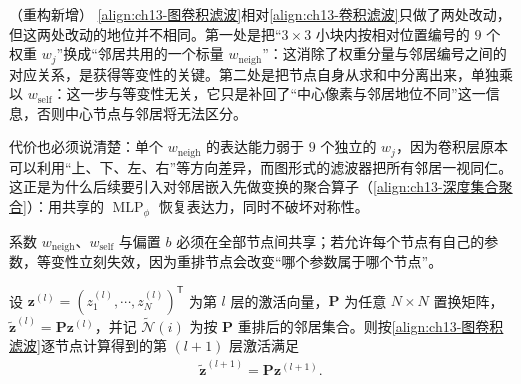 \documentclass[../../main.tex]{subfiles}
\begin{document}
\begin{remark}（重构新增）
\eqref{align:ch13-图卷积滤波}相对\eqref{align:ch13-卷积滤波}只做了两处改动，但这两处改动的地位并不相同。第一处是把“$3\times 3$ 小块内按相对位置编号的 $9$ 个权重 $w_j$”换成“邻居共用的一个标量 $w_{\mathrm{neigh}}$”：这消除了权重分量与邻居编号之间的对应关系，是获得等变性的关键。第二处是把节点自身从求和中分离出来，单独乘以 $w_{\mathrm{self}}$：这一步与等变性无关，它只是补回了“中心像素与邻居地位不同”这一信息，否则中心节点与邻居将无法区分。\par
代价也必须说清楚：单个 $w_{\mathrm{neigh}}$ 的表达能力弱于 $9$ 个独立的 $w_j$，因为卷积层原本可以利用“上、下、左、右”等方向差异，而图形式的滤波器把所有邻居一视同仁。这正是为什么后续要引入对邻居嵌入先做变换的聚合算子（\eqref{align:ch13-深度集合聚合}）：用共享的 $\operatorname{MLP}_\phi$ 恢复表达力，同时不破坏对称性。\par
系数 $w_{\mathrm{neigh}}$、$w_{\mathrm{self}}$ 与偏置 $b$ 必须在全部节点间共享；若允许每个节点有自己的参数，等变性立刻失效，因为重排节点会改变“哪个参数属于哪个节点”。
\end{remark}

\begin{proposition}[图形式卷积滤波器的置换等变性]\label{proposition:ch13-图滤波器等变性}
设 $\bm{z}^{(l)}=(z_1^{(l)},\cdots,z_N^{(l)})^{\mathsf T}$ 为第 $l$ 层的激活向量，$\bm{P}$ 为任意 $N\times N$ 置换矩阵，$\widetilde{\bm{z}}^{(l)}=\bm{P}\bm{z}^{(l)}$，并记 $\widetilde{\mathcal{N}}(i)$ 为按 $\bm{P}$ 重排后的邻居集合。则按\eqref{align:ch13-图卷积滤波}逐节点计算得到的第 $(l+1)$ 层激活满足
\begin{align*}
\widetilde{\bm{z}}^{(l+1)}=\bm{P}\bm{z}^{(l+1)}.
\end{align*}
\end{proposition}
\end{document}
